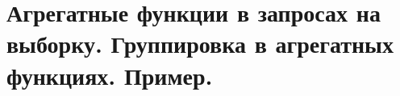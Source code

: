 {
	\section{Агрегатные функции в запросах на выборку. Группировка в агрегатных функциях. Пример.}
	\newpage
}

